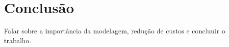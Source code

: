 \chapter{Conclusão} 

Falar sobre a importância da modelagem, redução de custos e concluuir o trabalho.
